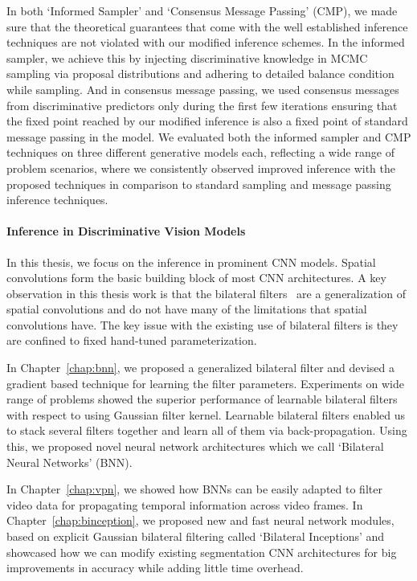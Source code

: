 In both `Informed Sampler' and `Consensus Message
Passing' (CMP), we made sure that the theoretical guarantees that come with
the well established inference techniques are not violated with our modified
inference schemes. In the informed sampler, we achieve this by injecting
discriminative knowledge in MCMC sampling via proposal distributions and
adhering to detailed balance condition while sampling. And in consensus
message passing, we used consensus messages from discriminative predictors only
during the first few iterations ensuring that the fixed point reached by our
modified inference is also a fixed point of standard message passing in the
model. We evaluated both the informed sampler and CMP techniques on three
different generative models each, reflecting a wide range of problem scenarios,
where we consistently observed improved inference with the proposed techniques
in comparison to standard sampling and message passing inference techniques.


\paragraph{Inference in Discriminative Vision Models} In this thesis, we focus
on the inference in prominent CNN models. Spatial convolutions form the basic
building block of most CNN architectures.
A key observation in this thesis work is that the bilateral
filters~\cite{aurich1995non,tomasi1998bilateral}
are a generalization of spatial convolutions and do not have many of the limitations
that spatial convolutions have. The key issue with the existing use of bilateral
filters is they are confined to fixed hand-tuned parameterization.

In Chapter~\ref{chap:bnn}, we proposed a generalized bilateral filter and devised
a gradient based technique for
learning the filter parameters. Experiments on wide range of problems showed the
superior performance of learnable bilateral filters with respect to using Gaussian
filter kernel. Learnable bilateral filters enabled us to stack several filters
together and learn all of them via back-propagation. Using this, we proposed
novel neural network architectures which we call `Bilateral Neural Networks' (BNN).

In Chapter~\ref{chap:vpn}, we showed how BNNs can be easily adapted to filter video
data for propagating temporal information across video frames.
In Chapter~\ref{chap:binception}, we proposed new and fast neural network modules, based
on explicit Gaussian bilateral filtering called `Bilateral Inceptions' and showcased
how we can modify existing segmentation CNN architectures for big improvements in
accuracy while adding little time overhead.

